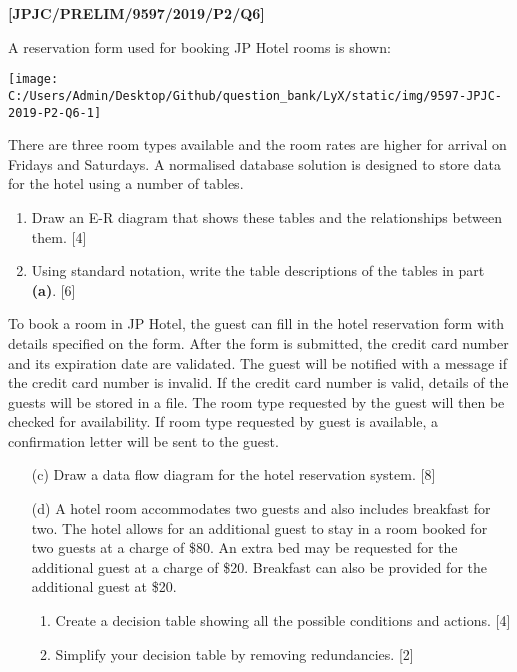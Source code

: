 \item \textbf{{[}JPJC/PRELIM/9597/2019/P2/Q6{]} }

A reservation form used for booking JP Hotel rooms is shown:
\begin{center}
\texttt{[image: C:/Users/Admin/Desktop/Github/question\_bank/LyX/static/img/9597-JPJC-2019-P2-Q6-1]}
\par\end{center}

There are three room types available and the room rates are higher
for arrival on Fridays and Saturdays. A normalised database solution
is designed to store data for the hotel using a number of tables.
\begin{enumerate}
\item Draw an E-R diagram that shows these tables and the relationships
between them. \hfill{}{[}4{]}
\item Using standard notation, write the table descriptions of the tables
in part \textbf{(a)}. \hfill{} {[}6{]}
\end{enumerate}
To book a room in JP Hotel, the guest can fill in the hotel reservation
form with details specified on the form. After the form is submitted,
the credit card number and its expiration date are validated. The
guest will be notified with a message if the credit card number is
invalid. If the credit card number is valid, details of the guests
will be stored in a file. The room type requested by the guest will
then be checked for availability. If room type requested by guest
is available, a confirmation letter will be sent to the guest. 
\begin{enumerate}
\item[(c)]  Draw a data flow diagram for the hotel reservation system. \hfill{}{[}8{]}
\item[(d)]  A hotel room accommodates two guests and also includes breakfast
for two. The hotel allows for an additional guest to stay in a room
booked for two guests at a charge of \$80. An extra bed may be requested
for the additional guest at a charge of \$20. Breakfast can also be
provided for the additional guest at \$20.
\begin{enumerate}
\item Create a decision table showing all the possible conditions and actions.
\hfill{} {[}4{]}
\item Simplify your decision table by removing redundancies. \hfill{} {[}2{]}
\end{enumerate}
\end{enumerate}
